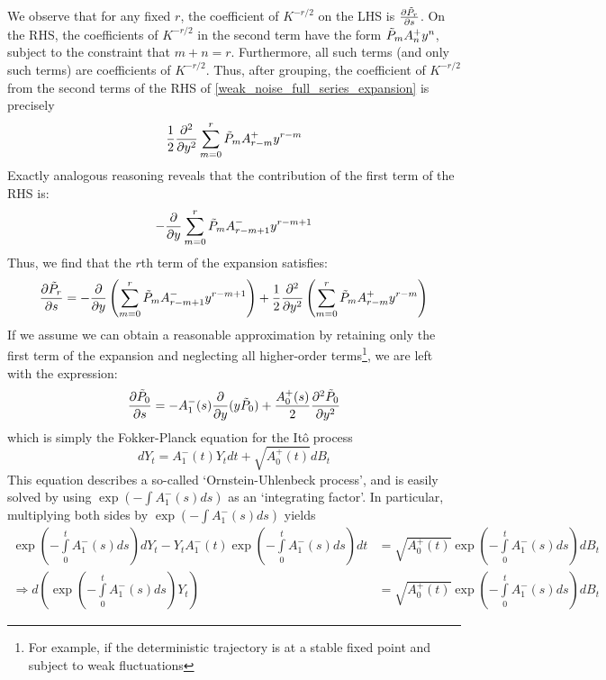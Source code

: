 We observe that for any fixed $r$, the coefficient of $K^{-r/2}$ on the LHS is $\frac{\partial \Tilde{P}_r}{\partial s}$. On the RHS, the coefficients of $K^{-r/2}$ in the second term have the form $\Tilde{P}_{m}A^+_{n}y^n$, subject to the constraint that $m+n=r$. Furthermore, all such terms (and only such terms) are coefficients of $K^{-r/2}$. Thus, after grouping, the coefficient of $K^{-r/2}$ from the second terms of the RHS of \eqref{weak_noise_full_series_expansion} is precisely
\begin{equation*}
    \frac{1}{2}\frac{\partial^2}{\partial y^2}\sum\limits_{m=0}^{r}\Tilde{P}_{m}A^+_{r-m}y^{r-m}
\end{equation*}
Exactly analogous reasoning reveals that the contribution of the first term of the RHS is:
\begin{equation*}
    -\frac{\partial}{\partial y}\sum\limits_{m=0}^{r}\Tilde{P}_{m}A^-_{r-m+1}y^{r-m+1}
\end{equation*}
Thus, we find that the $r$th term of the expansion satisfies:
\begin{equation}
\label{weak_noise_expansion_each_term}
\frac{\partial \Tilde{P}_r}{\partial s} = -\frac{\partial}{\partial y}\left(\sum\limits_{m=0}^{r}\Tilde{P}_{m}A^-_{r-m+1}y^{r-m+1}\right) + \frac{1}{2}\frac{\partial^2}{\partial y^2}\left(\sum\limits_{m=0}^{r}\Tilde{P}_{m}A^+_{r-m}y^{r-m}\right)
\end{equation}
If we assume we can obtain a reasonable approximation by retaining only the first term of the expansion and neglecting all higher-order terms\footnote{For example, if the deterministic trajectory is at a stable fixed point and subject to weak fluctuations}, we are left with the expression:
\begin{equation}
\label{1D_WNA}
\frac{\partial \Tilde{P}_0}{\partial s} = -A^-_1(s)\frac{\partial}{\partial y}(y\Tilde{P}_0) + \frac{A^+_{0}(s)}{2}\frac{\partial^2 \Tilde{P}_{0}}{\partial y^2}
\end{equation}
which is simply the Fokker-Planck equation for the It\^{o} process
\begin{equation*}
    dY_t = A^-_1(t)Y_tdt + \sqrt{A^+_0(t)}dB_t
\end{equation*}
This equation describes a so-called `Ornstein-Uhlenbeck process', and is easily solved by using $\exp(-\int A^-_1(s)ds)$ as an `integrating factor'. In particular, multiplying both sides by $\exp(-\int A^-_1(s)ds)$ yields
\begin{align*}
    \exp\left(-{\int\limits_{0}^{t}A^-_1(s)ds}\right)dY_t - Y_tA^-_1(t)\exp\left(-{\int\limits_{0}^{t}A^-_1(s)ds}\right)dt &= \sqrt{A^+_0(t)}\exp\left(-{\int\limits_{0}^{t}A^-_1(s)ds}\right)dB_t\\
    \Rightarrow d\left(\exp\left(-{\int\limits_{0}^{t}A^-_1(s)ds}\right)Y_t\right) &= \sqrt{A^+_0(t)}\exp\left(-{\int\limits_{0}^{t}A^-_1(s)ds}\right)dB_t
\end{align*}
